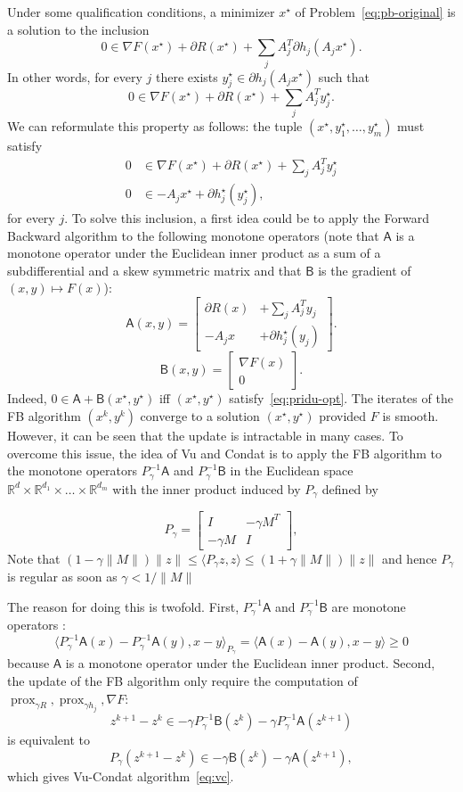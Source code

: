 \documentclass{article}
\DeclareMathOperator{\prox}{prox}
\newcommand{\sA}{{\mathsf A}}
\newcommand{\sB}{{\mathsf B}}
\newcommand{\bR}{{\mathbb R}}
\newcommand{\ps}[1]{\langle #1 \rangle}
\theoremstyle{definition}
\begin{document}
Under some qualification conditions, a minimizer $x^\star$ of Problem~\eqref{eq:pb-original} is a solution to the inclusion
$$
0 \in \nabla F(x^\star) + \partial R(x^\star) + \sum_j A_j^T \partial h_j (A_j x^\star).
$$
In other words, for every $j$ there exists $y_j^\star \in \partial h_j (A_j x^\star)$ such that
$$
0 \in \nabla F(x^\star) + \partial R(x^\star) + \sum_j A_j^T y_j^\star.
$$
We can reformulate this property as follows: the tuple $(x^\star,y_1^\star,\ldots,y_m^\star)$ must satisfy
\begin{align}
    \label{eq:pridu-opt}
    0 &\in \nabla F(x^\star) + \partial R(x^\star)+ \sum_j A_j^T y_j^\star\\
    0 &\in -A_j x^\star + \partial h_j^\star(y_j^\star),
\end{align}
for every $j$.
To solve this inclusion, a first idea could be to apply the Forward Backward algorithm to the following monotone operators (note that $\sA$ is a monotone operator under the Euclidean inner product as a sum of a subdifferential and a skew symmetric matrix and that $\sB$ is the gradient of $(x,y) \mapsto F(x)$):
\[
\sA(x,y) = \begin{bmatrix} \partial R(x)&  + \sum_j A_j^T y_j \\ -A_j x& +\partial h_j^\star(y_j)\end{bmatrix} .
\]
\[
\sB(x,y) = \begin{bmatrix} \nabla F(x) \\ 0 \end{bmatrix} .
\]
Indeed, $0 \in \sA+\sB(x^\star,y^\star)$ iff $(x^\star,y^\star)$ satisfy~\eqref{eq:pridu-opt}.
The iterates of the FB algorithm $(x^k,y^k)$ converge  to a solution $(x^\star,y^\star)$ provided $F$ is smooth. However, it can be seen that the update is intractable in many cases.
To overcome this issue, the idea of Vu and Condat is to apply the FB algorithm to the monotone operators $P_\gamma^{-1} \sA$ and $P_\gamma^{-1} \sB$ in the Euclidean space $\bR^d \times \bR^{d_1} \times \ldots \times \bR^{d_m}$ with the inner product induced by $P_{\gamma}$ defined by

\[
P_\gamma = \begin{bmatrix} I &  -\gamma M^T \\ -\gamma M & I \end{bmatrix},
\]
Note that $(1-\gamma\|M\|)\|z\| \leq \ps{P_\gamma z,z} \leq (1+\gamma\|M\|)\|z\|$ and hence $P_\gamma$ is regular as soon as $\gamma < 1/\|M\|$

The reason for doing this is twofold.
First, $P_\gamma^{-1} \sA$ and $P_\gamma^{-1} \sB$ are monotone operators :
$$
\ps{P_\gamma^{-1} \sA(x) - P_\gamma^{-1} \sA(y),x-y}_{P_\gamma} = \ps{\sA(x) - \sA(y),x-y} \geq 0
$$
because $\sA$ is a monotone operator under the Euclidean inner product.
Second, the update of the FB algorithm only require the computation of $\prox_{\gamma R}, \prox_{\gamma h_j}, \nabla F$:
$$z^{k+1} - z^k \in -\gamma P_\gamma^{-1} \sB(z^k) - \gamma P_\gamma^{-1} \sA(z^{k+1})$$
is equivalent to 
$$
P_\gamma (z^{k+1} - z^k) \in -\gamma \sB(z^k) - \gamma \sA(z^{k+1}),
$$
which gives Vu-Condat algorithm~\eqref{eq:vc}.
\end{document}
